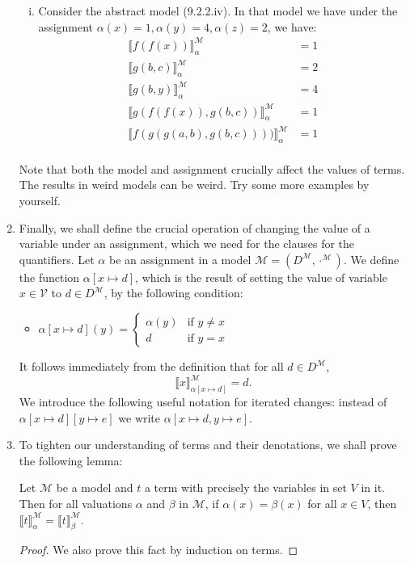 \begin{enumerate}[\thesection.1]
\begin{enumerate}[(i)]
		\item Consider the abstract model (9.2.2.iv). In that model we have under the assignment $\alpha(x)=1, \alpha(y)=4, \alpha(z)=2$, we have:		
		\begin{align*}
		\llbracket f(f(x))\rrbracket^\mathcal{M}_\alpha&=1\\
		\llbracket g(b,c)\rrbracket^\mathcal{M}_\alpha&=2\\	
		\llbracket g(b,y)\rrbracket^\mathcal{M}_\alpha&=4\\	
		\llbracket g(f(f(x)), g(b,c))\rrbracket^\mathcal{M}_\alpha&=1\\
		\llbracket f(g(g(a,b),g(b,c))))\rrbracket^\mathcal{M}_\alpha&=1\\
		\end{align*}
		
		\end{enumerate}
		Note that both the model and assignment crucially affect the values of terms. The results in weird models can be weird. Try some more examples by yourself.
		
		\item Finally, we shall define the crucial operation of changing the value of a variable under an assignment, which we need for the clauses for the quantifiers. Let $\alpha$ be an assignment in a model $\mathcal{M}=(D^\mathcal{M},\cdot^\mathcal{M})$. We define the function $\alpha[x\mapsto d]$, which is the result of setting the value of variable $x\in\mathcal{V}$ to $d\in D^\mathcal{M}$, by the following condition:
		
		\begin{itemize}
		
			\item $\alpha[x\mapsto d](y)=\begin{cases} \alpha(y) &\text{if }y\neq x\\ d & \text{if }y=x\end{cases}$
		
		\end{itemize}
		
		It follows immediately from the definition that for all  $d\in D^\mathcal{M}$, \[\llbracket x\rrbracket^\mathcal{M}_{\alpha[x\mapsto d]}=d.\] We introduce the following useful notation for iterated changes: instead of $\alpha[x\mapsto d][y\mapsto e]$ we write $\alpha[x\mapsto d, y\mapsto e]$.
		
		\item To tighten our understanding of terms and their denotations, we shall prove the following lemma:
		\begin{lemma}
		Let $\mathcal{M}$ be a model and $t$ a term with precisely the variables in set $V$ in it. Then for all valuations $\alpha$ and $\beta$ in $\mathcal{M}$, if $\alpha(x)=\beta(x)$ for all $x\in V$, then $\llbracket t\rrbracket_\alpha^\mathcal{M}=\llbracket t\rrbracket_\beta^\mathcal{M}$.
		\end{lemma}
		\begin{proof}
		We also prove this fact by induction on terms. 
		

\end{proof}
\end{enumerate}
